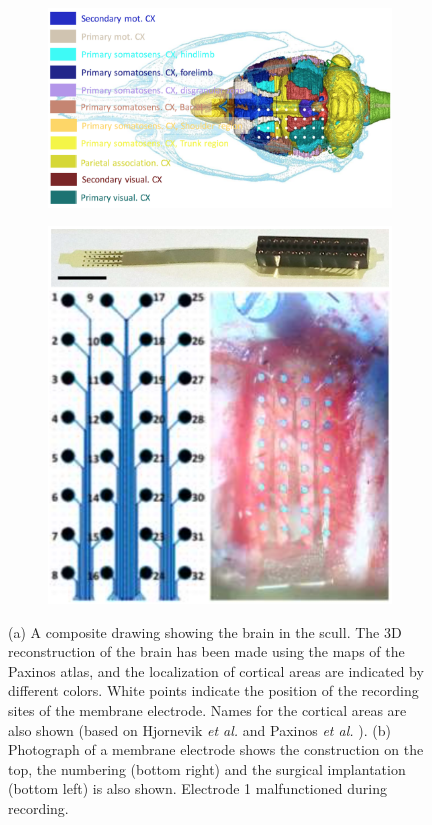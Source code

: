 \begin{figure}[H]
  \centering
  \begin{subfigure}[b]{0.45\textwidth}
    \includegraphics[width=0.95\linewidth]{figures/rat_brain_schematic.png}
    \caption{}
  \end{subfigure}
  \begin{subfigure}[b]{0.45\textwidth}
    \centering
    \includegraphics[width=0.95\linewidth]{figures/rat_scull_and_instrument.png}
    \caption{}
  \end{subfigure}
  \caption{(a) A composite drawing showing the brain in the scull. The 3D reconstruction of the brain has been made using the maps of the Paxinos atlas, and the localization of cortical areas are indicated by different colors. White points indicate the position of the recording sites of the membrane electrode. Names for the cortical areas are also shown (based on Hjornevik \textit{et al.} and Paxinos \textit{et al.} \cite{hjornevik2007} \cite{paxinos2009}). (b) Photograph of a membrane electrode shows the construction on the top, the numbering (bottom right) and the surgical implantation (bottom left) is also shown. Electrode 1 malfunctioned during recording.}
  \label{fig:rat_experiment}
\end{figure}


